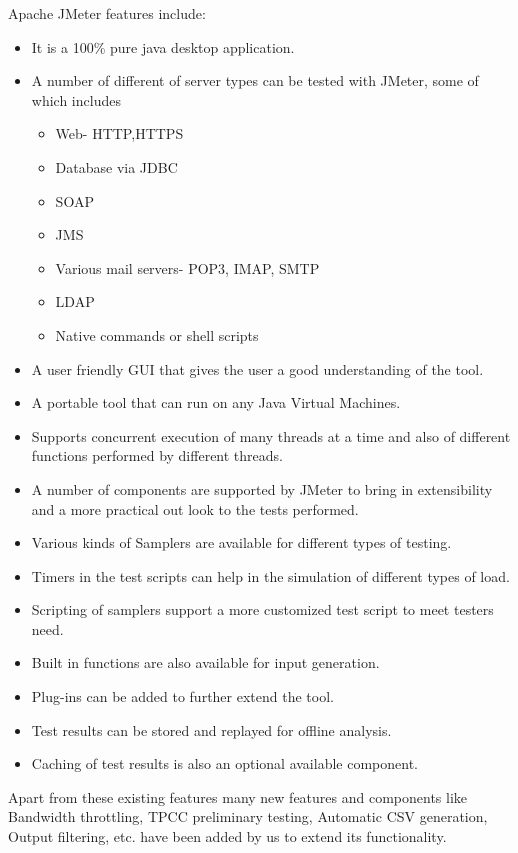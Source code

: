 \documentclass[12pt]{book}
\begin{document}
Apache JMeter features include:
\begin{itemize}
 \item It is a 100\% pure java desktop application.
 \item A number of different of server types can be tested with JMeter, some of which includes
 \begin{itemize}
   \item Web- HTTP,HTTPS
   \item Database via JDBC
   \item SOAP
   \item JMS
   \item Various mail servers- POP3, IMAP, SMTP
   \item LDAP
   \item Native commands or shell scripts
 \end{itemize}
 \item A user friendly GUI that gives the user a good understanding of the tool.
 \item A portable tool that can run on any Java Virtual Machines.
 \item Supports concurrent execution of many threads at a time and also of different functions performed by different threads.
 \item A number of components are supported by JMeter to bring in extensibility and a more practical out look to the tests performed.
 \item Various kinds of Samplers are available for different types of testing.
 \item Timers in the test scripts can help in the simulation of different types of load.
 \item Scripting of samplers support a more customized test script to meet testers need.
 \item Built in functions are also available for input generation.
 \item Plug-ins can be added to further extend the tool.
 \item Test results can be stored and replayed for offline analysis.
 \item Caching of test results is also an optional available component.
\end{itemize}
Apart from these existing features many new features and components like Bandwidth throttling, TPCC preliminary testing, Automatic CSV generation,
Output filtering, etc. have been added by us to extend its functionality.
\end{document}
